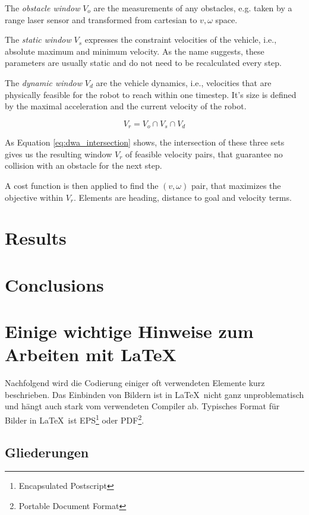 The \emph{obstacle window} $V_o$ are the measurements of any obstacles, e.g. taken by a range laser sensor and transformed from cartesian to $v,\omega$ space.

The \emph{static window} $V_s$ expresses the constraint velocities of the vehicle, i.e., absolute maximum and minimum velocity. As the name suggests, these parameters are usually static and do not need to be recalculated every step.

The \emph{dynamic window} $V_d$ are the vehicle dynamics, i.e., velocities that are physically feasible for the robot to reach within one timestep. It's size is defined by the maximal acceleration and the current velocity of the robot.

\begin{equation}
V_r = V_o \cap V_s \cap V_d
 	\label{eq:dwa_intersection}
\end{equation}

As Equation \cref{eq:dwa_intersection} shows, the intersection of these three sets gives us the resulting window $V_r$ of feasible velocity pairs, that guarantee no collision with an obstacle for the next step.

A cost function is then applied to find the $(v,\omega)$ pair, that maximizes the objective within $V_r$. Elements are heading, distance to goal and velocity terms.

\chapter{Results}

\chapter{Conclusions}

\chapter{Einige wichtige Hinweise zum Arbeiten mit \LaTeX\ }
\label{sec:latexumg}

Nachfolgend wird die Codierung einiger oft verwendeten Elemente
kurz beschrieben. Das Einbinden von Bildern ist in \LaTeX\ nicht
ganz unproblematisch und hängt auch stark vom verwendeten Compiler
ab. Typisches Format für Bilder in \LaTeX\ ist
EPS\footnote{Encapsulated Postscript} oder PDF\footnote{Portable Document Format}.


\section{Gliederungen}
\label{sec:gliederung}

